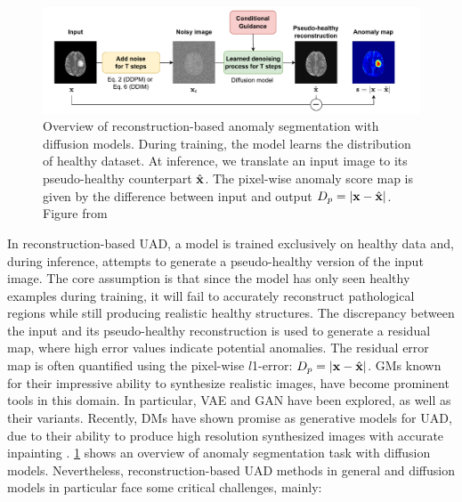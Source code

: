 \begin{figure}
    \centering
    \includegraphics[width=1\linewidth]{figures/uad-overview.pdf}
    \caption[Overview of reconstruction-based UAD]{Overview of reconstruction-based anomaly segmentation with diffusion models. During training, the model learns the distribution of healthy dataset. At inference, we translate an input image to its pseudo-healthy counterpart $\hat{{\mathbf{x}}}$. The pixel-wise anomaly score map is given by the difference between input and output $D_p = |{\mathbf{x}} - \hat{{\mathbf{x}}}|$. Figure from \cite{berceaDDPMforMedicalImagesStudy2024}}
    \label{fig:general-uad-diffusion-methods}
\end{figure}

In reconstruction-based \ac{UAD}, a model is trained exclusively on healthy data and, during inference, attempts to generate a pseudo-healthy version of the input image. The core assumption is that since the model has only seen healthy examples during training, it will fail to accurately reconstruct pathological regions while still producing realistic healthy structures. The discrepancy between the input and its pseudo-healthy reconstruction is used to generate a residual map, where high error values indicate potential anomalies. The residual error map is often quantified using the pixel-wise $l$1-error: $D_p = | {\mathbf{x}} - \hat{{\mathbf{x}}} |$. \ac{GMs} known for their impressive ability to synthesize realistic images, have become prominent tools in this domain. In particular, \ac{VAE} \cite{zimmerer2019VAE-UAD} and \ac{GAN} \cite{fAnoGAN} have been explored, as well as their variants. Recently, \ac{DMs} have shown promise as generative models for \ac{UAD}, due to their ability to produce high resolution synthesized images with accurate inpainting \cite{pinaya2022fastUAD-DDPM, wolleb2022DDPM-weaksupervise, behrendt2025cDDPM}. \cref{fig:general-uad-diffusion-methods} shows an overview of anomaly segmentation task with diffusion models. Nevertheless, reconstruction-based \ac{UAD} methods in general and diffusion models in particular face some critical challenges, mainly:

